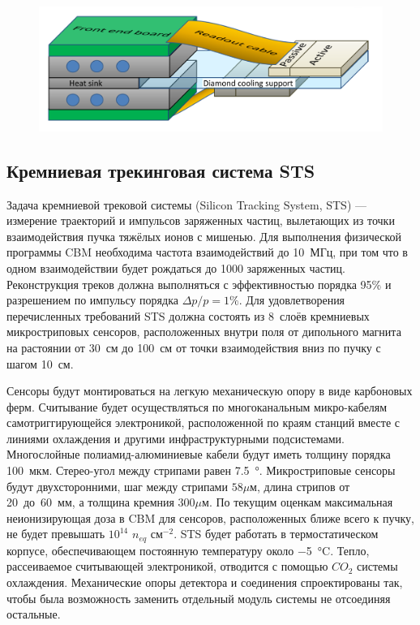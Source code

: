 \begin{figure}[H]
\includegraphics[width=1.0\textwidth]{pictures/MVD_3.png}
\caption{}
\label{fig:MVD3}
\end{figure}


\subsection{Кремниевая трекинговая система STS}\label{sec:secSTS}

Задача кремниевой трековой системы (Silicon Tracking System, STS) --- измерение траекторий и импульсов заряженных частиц, вылетающих из точки взаимодействия пучка тяжёлых ионов с мишенью. Для выполнения физической программы CBM необходима частота взаимодействий до 10~МГц, при том что в одном взаимодействии будет рождаться до 1000 заряженных частиц. Реконструкция треков должна выполняться с эффективностью порядка 95\% и разрешением по импульсу порядка $\Delta p / p = 1\%$. Для удовлетворения перечисленных требований STS должна состоять из 8~слоёв кремниевых микростриповых сенсоров, расположенных внутри поля от дипольного магнита на растоянии от 30~см до 100~см от точки взаимодействия вниз по пучку с шагом 10~см.

Сенсоры будут монтироваться на легкую механическую опору в виде карбоновых ферм. Считывание будет осуществляться по многоканальным микро-кабелям самотриггирующейся электроникой, расположенной по краям станций вместе с линиями охлаждения и другими инфраструктурными подсистемами.
Многослойные полиамид-алюминиевые кабели будут иметь толщину порядка 100~мкм.
Стерео-угол между стрипами равен \SI{7.5}{\degree}.
Микростриповые сенсоры будут двухсторонними, шаг между стрипами $58 \mu$м, длина стрипов от 20~до~60~мм, а толщина кремния $300 \mu$м. По текущим оценкам максимальная неионизирующая доза в CBM для сенсоров, расположенных ближе всего к пучку, не будет превышать $10^{14}$ $n_{eq}$ см$^{-2}$. STS будет работать в термостатическом корпусе, обеспечивающем постоянную температуру около \SI{-5}{\degreeCelsius}. Тепло, рассеиваемое считывающей электроникой, отводится с помощью $CO_{2}$ системы охлаждения. Механические опоры детектора и соединения спроектированы так, чтобы была возможность заменить отдельный модуль системы не отсоединяя остальные.

